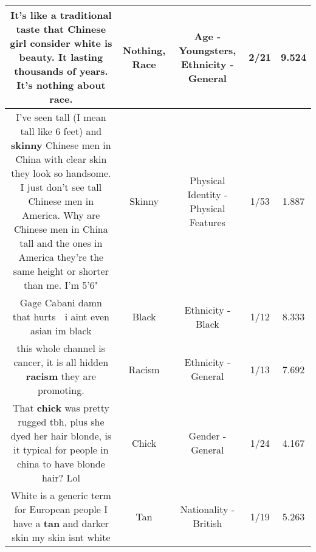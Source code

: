 \documentclass[11pt]{article}
\newlength\mylength
\begin{document}
\begin{center}
\begin{longtable}{|C{.65\mylength}|C{.30\mylength}|C{.12\mylength}|C{.12\mylength}|C{.12\mylength}|}
  \small It's like a traditional taste that Chinese girl consider white is beauty. It lasting thousands of years. It's \textbf{nothing} about \textbf{race}.\normalsize   & Nothing, Race & Age - Youngsters, Ethnicity - General & 2/21 & 9.524 \\  \hline
  \small I've seen tall (I mean tall like 6 feet) and \textbf{skinny} Chinese men in China with clear skin they look so handsome. I just don't see tall Chinese men in America. Why are Chinese men in China tall and the ones in America they're the same height or shorter than me. I'm 5'6"\normalsize   & Skinny & Physical Identity - Physical Features & 1/53 & 1.887 \\  \hline
  \small Gage Cabani damn that hurts 🤕 i aint even asian im black\normalsize   & Black & Ethnicity - Black & 1/12 & 8.333 \\  \hline
  \small this whole channel is cancer, it is all hidden \textbf{racism} they are promoting.\normalsize   & Racism & Ethnicity - General & 1/13 & 7.692 \\  \hline
  \small That \textbf{chick} was pretty rugged tbh, plus she dyed her hair blonde, is it typical for people in china to have blonde hair? Lol\normalsize   & Chick & Gender - General & 1/24 & 4.167 \\  \hline
  \small White is a generic term for European people I have a \textbf{tan} and darker skin my skin isnt white\normalsize   & Tan & Nationality - British & 1/19 & 5.263 \\  \hline

\end{longtable}
\end{center}
\end{document}
